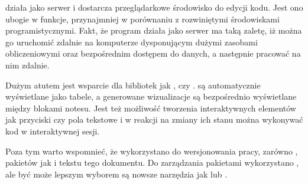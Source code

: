  działa jako serwer  i dostarcza przeglądarkowe środowisko do edycji kodu. Jest ono
ubogie w funkcje, przynajmniej w porównaniu z rozwiniętymi środowiskami programistycznymi. Fakt, że
program działa jako serwer ma taką zaletę, iż można go uruchomić zdalnie na komputerze dysponującym dużymi zasobami
obliczeniowymi oraz bezpośrednim dostępem do danych, a następnie pracować na nim zdalnie.

Dużym atutem jest wsparcie dla bibliotek jak ,  czy .
 są automatycznie wyświetlane jako tabele, a generowane wizualizacje są bezpośrednio wyświetlane
między blokami notesu. Jest też możliwość tworzenia interaktywnych elementów jak przyciski czy pola tekstowe i
w reakcji na zmiany ich stanu można wykonywać kod w interaktywnej sesji.

Poza tym warto wspomnieć, że wykorzystano  do wersjonowania pracy, zarówno , pakietów jak i tekstu tego dokumentu. Do zarządzania pakietami wykorzystano , ale być może lepszym wyborem są nowsze narzędzia jak  lub .

